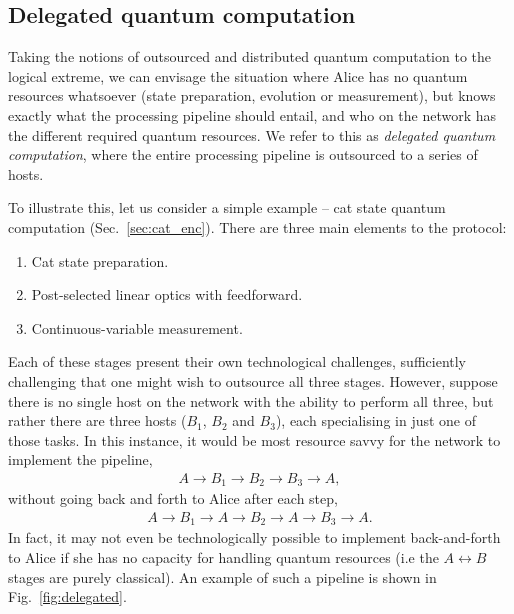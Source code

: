 \subsection{Delegated quantum computation} 

Taking the notions of outsourced and distributed quantum computation to the logical extreme, we can envisage the situation where Alice has no quantum resources whatsoever (state preparation, evolution or measurement), but knows exactly what the processing pipeline should entail, and who on the network has the different required quantum resources. We refer to this as \textit{delegated quantum computation}, where the entire processing pipeline is outsourced to a series of hosts.

To illustrate this, let us consider a simple example -- cat state quantum computation (Sec.~\ref{sec:cat_enc}). There are three main elements to the protocol:
\begin{enumerate}
\item Cat state preparation.
\item Post-selected linear optics with feedforward.
\item Continuous-variable measurement.
\end{enumerate}

Each of these stages present their own technological challenges, sufficiently challenging that one might wish to outsource all three stages. However, suppose there is no single host on the network with the ability to perform all three, but rather there are three hosts ($B_1$, $B_2$ and $B_3$), each specialising in just one of those tasks. In this instance, it would be most resource savvy for the network to implement the pipeline,
\begin{align}
	A\to B_1\to B_2\to B_3\to A,
\end{align}
without going back and forth to Alice after each step,
\begin{align}
	A\to B_1\to A\to B_2 \to A\to B_3\to A.
\end{align}
In fact, it may not even be technologically possible to implement back-and-forth to Alice if she has no capacity for handling quantum resources (i.e the \mbox{$A\leftrightarrow B$} stages are purely classical). An example of such a pipeline is shown in Fig.~\ref{fig:delegated}.

